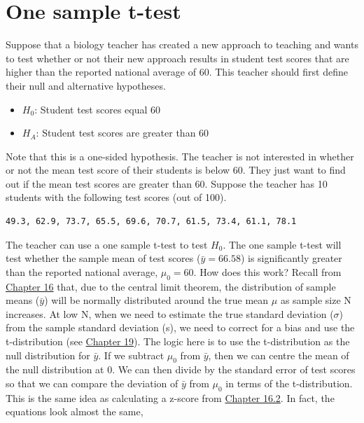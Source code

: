 \documentclass[
  openany]{scrbook}
\providecommand{\tightlist}{%
  \setlength{\itemsep}{0pt}\setlength{\parskip}{0pt}}
\begin{document}
\hypertarget{one-sample-t-test}{%
\section{One sample t-test}\label{one-sample-t-test}}

Suppose that a biology teacher has created a new approach to teaching and wants to test whether or not their new approach results in student test scores that are higher than the reported national average of 60.
This teacher should first define their null and alternative hypotheses.

\begin{itemize}
\tightlist
\item
  \(H_{0}\): Student test scores equal 60
\item
  \(H_{A}\): Student test scores are greater than 60
\end{itemize}

Note that this is a one-sided hypothesis.
The teacher is not interested in whether or not the mean test score of their students is below 60.
They just want to find out if the mean test scores are greater than 60.
Suppose the teacher has 10 students with the following test scores (out of 100).

\begin{verbatim}
49.3, 62.9, 73.7, 65.5, 69.6, 70.7, 61.5, 73.4, 61.1, 78.1
\end{verbatim}

The teacher can use a one sample t-test to test \(H_{0}\).
The one sample t-test will test whether the sample mean of test scores (\(\bar{y} = 66.58\)) is significantly greater than the reported national average, \(\mu_{0} = 60\).
How does this work?
Recall from \protect\hyperlink{Chapter_16}{Chapter 16} that, due to the central limit theorem, the distribution of sample means (\(\bar{y}\)) will be normally distributed around the true mean \(\mu\) as sample size N increases.
At low N, when we need to estimate the true standard deviation (\(\sigma\)) from the sample standard deviation (s), we need to correct for a bias and use the t-distribution (see \protect\hyperlink{Chapter_19}{Chapter 19}).
The logic here is to use the t-distribution as the null distribution for \(\bar{y}\).
If we subtract \(\mu_{0}\) from \(\bar{y}\), then we can centre the mean of the null distribution at 0.
We can then divide by the standard error of test scores so that we can compare the deviation of \(\bar{y}\) from \(\mu_{0}\) in terms of the t-distribution.
This is the same idea as calculating a z-score from \protect\hyperlink{probability-and-z-scores}{Chapter 16.2}.
In fact, the equations look almost the same,
\end{document}
